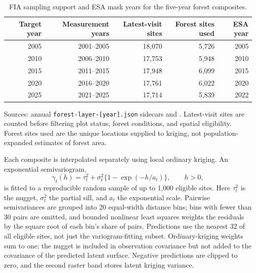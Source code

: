 \documentclass[11pt]{article}
\begin{document}
\begin{table}[htbp]
\centering
\caption{FIA sampling support and ESA mask years for the five-year forest composites.}
\label{tab:forest-layer-samples}
\begin{tabular}{@{}rrrrr@{}}
\toprule
Target year & Measurement years & Latest-visit sites & Forest sites used & ESA year \\
\midrule
2005 & 2001--2005 & 18,070 & 5,726 & 2005 \\
2010 & 2006--2010 & 17,753 & 5,948 & 2010 \\
2015 & 2011--2015 & 17,948 & 6,099 & 2015 \\
2020 & 2016--2020 & 17,761 & 6,022 & 2020 \\
2025 & 2021--2025 & 17,714 & 5,839 & 2022 \\
\bottomrule
\end{tabular}

\smallskip
\begin{minipage}{0.95\linewidth}
\footnotesize Sources: annual \texttt{forest-layer-[year].json} sidecars and . Latest-visit sites are counted before filtering plot status, forest conditions, and spatial eligibility. Forest sites used are the unique locations supplied to kriging, not population-expanded estimates of forest area.
\end{minipage}
\end{table}

Each composite is interpolated separately using local ordinary kriging. An exponential semivariogram,
\begin{equation}
\gamma_t(h)=\tau_t^2+\sigma_t^2\{1-\exp(-h/a_t)\},\qquad h>0,
\label{eq:forest-variogram}
\end{equation}
is fitted to a reproducible random sample of up to 1,000 eligible sites.
Here $\tau_t^2$ is the nugget, $\sigma_t^2$ the partial sill, and $a_t$ the exponential scale. Pairwise semivariances are grouped into 20 equal-width distance bins; bins with fewer than 30 pairs are omitted, and bounded nonlinear least squares weights the residuals by the square root of each bin's share of pairs. Predictions use the nearest 32 of all eligible sites, not just the variogram-fitting subset. Ordinary-kriging weights sum to one; the nugget is included in observation covariance but not added to the covariance of the predicted latent surface. Negative predictions are clipped to zero, and the second raster band stores latent kriging variance.
\end{document}
